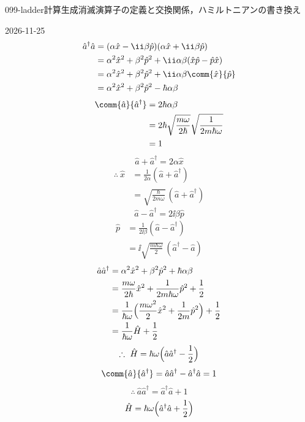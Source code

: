 \documentclass[uplatex,dvipdfmx,a4paper,11pt]{jsarticle}
\begin{document}
\begin{mondai}{099-ladder}{計算}{生成消滅演算子の定義と交換関係，ハミルトニアンの書き換え}
\begin{kotaeutsushi}{2026-11-25}
\begin{align*}
\hat{a}^{\dagger}\hat{a}&=(\alpha\hat{x}-\ii\beta\hat{p})(\alpha\hat{x}+\ii\beta\hat{p})\\
&=\alpha^{2}\hat{x}^{2}+\beta^{2}\hat{p}^{2}+\ii\alpha\beta(\hat{x}\hat{p}-\hat{p}\hat{x})\\
&=\alpha^{2}\hat{x}^{2}+\beta^{2}\hat{p}^{2}+\ii\alpha\beta\comm{\hat{x}}{\hat{p}}\\
&=\alpha^{2}\hat{x}^{2}+\beta^{2}\hat{p}^{2}-\hbar\alpha\beta
\end{align*}
\begin{align*}
\comm{\hat{a}}{\hat{a}^{\dagger}}&=2\hbar\alpha\beta\\
&=2\hbar\sqrt{\frac{m\omega}{2\hbar}}\sqrt{\frac{1}{2m\hbar\omega}}\\
&=1
\end{align*}
\[ \hat{a}+\hat{a}^{\dagger}=2\alpha\hat{x} \]
\begin{align*}
\therefore\ \hat{x}&=\frac{1}{2\alpha}(\hat{a}+\hat{a}^{\dagger})\\
&=\sqrt{\frac{\hbar}{2m\omega}}\,(\hat{a}+\hat{a}^{\dagger})
\end{align*}
\[ \hat{a}-\hat{a}^{\dagger}=2\ii\beta\hat{p} \]
\begin{align*}
\hat{p}&=\frac{1}{2\ii\beta}(\hat{a}-\hat{a}^{\dagger})\\
&=\ii\sqrt{\frac{m\hbar\omega}{2}}\,(\hat{a}^{\dagger}-\hat{a})
\end{align*}
\begin{align*}
\hat{a}\hat{a}^{\dagger}&=\alpha^{2}\hat{x}^{2}+\beta^{2}\hat{p}^{2}+\hbar\alpha\beta\\
&=\frac{m\omega}{2\hbar}\hat{x}^{2}+\frac{1}{2m\hbar\omega}\hat{p}^{2}+\frac{1}{2}\\
&=\frac{1}{\hbar\omega}\Bigl(\frac{m\omega^{2}}{2}\hat{x}^{2}+\frac{1}{2m}\hat{p}^{2}\Bigr)+\frac{1}{2}\\
&=\frac{1}{\hbar\omega}\hat{H}+\frac{1}{2}
\end{align*}
\[ \therefore\ \hat{H}=\hbar\omega\Bigl(\hat{a}\hat{a}^{\dagger}-\frac{1}{2}\Bigr) \]
\[ \comm{\hat{a}}{\hat{a}^{\dagger}}=\hat{a}\hat{a}^{\dagger}-\hat{a}^{\dagger}\hat{a}=1 \]
\[ \therefore\ \hat{a}\hat{a}^{\dagger}=\hat{a}^{\dagger}\hat{a}+1 \]
\[ \hat{H}=\hbar\omega\Bigl(\hat{a}^{\dagger}\hat{a}+\frac{1}{2}\Bigr) \]
\end{kotaeutsushi}
\end{mondai}
\end{document}

